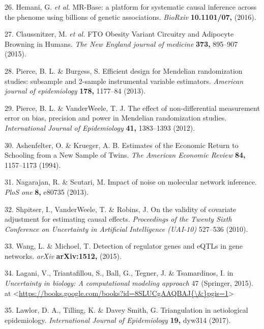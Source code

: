 \documentclass[]{article}
\begin{document}
\hypertarget{ref-Hemani2016}{}
26. Hemani, G. \emph{et al.} MR-Base: a platform for systematic causal
inference across the phenome using billions of genetic associations.
\emph{BioRxiv} \textbf{10.1101/07,} (2016).

\hypertarget{ref-Claussnitzer2015}{}
27. Claussnitzer, M. \emph{et al.} FTO Obesity Variant Circuitry and
Adipocyte Browning in Humans. \emph{The New England journal of medicine}
\textbf{373,} 895--907 (2015).

\hypertarget{ref-Pierce2013}{}
28. Pierce, B. L. \& Burgess, S. Efficient design for Mendelian
randomization studies: subsample and 2-sample instrumental variable
estimators. \emph{American journal of epidemiology} \textbf{178,}
1177--84 (2013).

\hypertarget{ref-Pierce2012}{}
29. Pierce, B. L. \& VanderWeele, T. J. The effect of non-differential
measurement error on bias, precision and power in Mendelian
randomization studies. \emph{International Journal of Epidemiology}
\textbf{41,} 1383--1393 (2012).

\hypertarget{ref-Ashenfelter1994}{}
30. Ashenfelter, O. \& Krueger, A. B. Estimates of the Economic Return
to Schooling from a New Sample of Twins. \emph{The American Economic
Review} \textbf{84,} 1157--1173 (1994).

\hypertarget{ref-Nagarajan2013}{}
31. Nagarajan, R. \& Scutari, M. Impact of noise on molecular network
inference. \emph{PloS one} \textbf{8,} e80735 (2013).

\hypertarget{ref-Shpitser2010}{}
32. Shpitser, I., VanderWeele, T. \& Robins, J. On the validity of
covariate adjustment for estimating causal effects. \emph{Proceedings of
the Twenty Sixth Conference on Uncertainty in Artificial Intelligence
(UAI-10)} 527--536 (2010).

\hypertarget{ref-Wang2015}{}
33. Wang, L. \& Michoel, T. Detection of regulator genes and eQTLs in
gene networks. \emph{arXiv} \textbf{arXiv:1512,} (2015).

\hypertarget{ref-Lagani2015}{}
34. Lagani, V., Triantafillou, S., Ball, G., Tegner, J. \& Tsamardinos,
I. in \emph{Uncertainty in biology: A computational modeling approach}
47 (Springer, 2015). at
\textless{}\href{https://books.google.com/books?id=8SLUCgAAQBAJ\%7B/\&\%7Dpgis=1}{https://books.google.com/books?id=8SLUCgAAQBAJ\{\textbackslash{}\&\}pgis=1}\textgreater{}

\hypertarget{ref-Lawlor2017}{}
35. Lawlor, D. A., Tilling, K. \& Davey Smith, G. Triangulation in
aetiological epidemiology. \emph{International Journal of Epidemiology}
\textbf{19,} dyw314 (2017).
\end{document}
